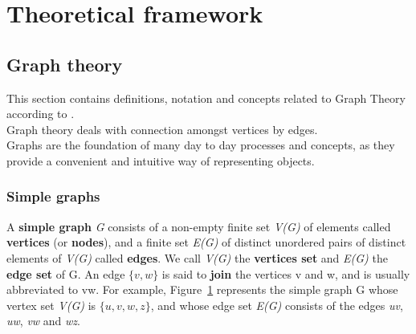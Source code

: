 \section{Theoretical framework}

\subsection{Graph theory}
This section contains definitions, notation and concepts related to Graph Theory according
to \cite{graph_theory:2010}. \\
Graph theory deals with connection amongst vertices by edges. \\
Graphs are the foundation of many day to day processes and concepts, as they provide a convenient
and intuitive way of representing objects.

\subsubsection{Simple graphs}
A \textbf{simple graph} \textit{G} consists of a non-empty finite set \textit{V(G)} of elements called \textbf{vertices}
(or \textbf{nodes}), and a finite set \textit{E(G)} of distinct unordered pairs of distinct elements of \textit{V(G)}
called \textbf{edges}. We call \textit{V(G)} the \textbf{vertices set} and \textit{E(G)} the \textbf{edge set} of G.
An edge $\{\textit{v}, \textit{w}\}$ is said to \textbf{join} the vertices v and w, and is usually abbreviated to vw. For example, Figure~\ref{fig:simple_graph} represents the simple graph G whose vertex set \textit{V(G)} is $\{\textit{u}, \textit{v}, \textit{w}, \textit{z}\}$, and whose
edge set \textit{E(G)} consists of the edges \textit{uv}, \textit{uw}, \textit{vw} and \textit{wz}. 

\begin{figure}[H]
    \centering
    \caption{}
    \label{fig:simple_graph}
\end{figure}

